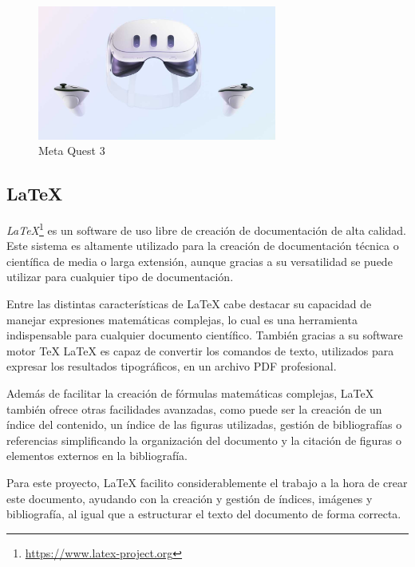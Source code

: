 \documentclass[a4paper, 12pt]{book}
\begin{document}
\begin{figure}[H] 
  \centering
  \includegraphics[width=0.7\textwidth]{img/meta_quest.jpg}
  \caption{Meta Quest 3}
  \label{fig:metaquest}
\end{figure}

\subsection{LaTeX}
\label{subsec:latex}

\textit{LaTeX}\footnote{\url{https://www.latex-project.org}} \cite{mittelbach2004latex} es un software de uso libre de creación de documentación de alta calidad. Este sistema es altamente utilizado para la creación de documentación técnica o científica de media o larga extensión, aunque gracias a su versatilidad se puede utilizar para cualquier tipo de documentación.

Entre las distintas características de LaTeX cabe destacar su capacidad de manejar expresiones matemáticas complejas, lo cual es una herramienta indispensable para cualquier documento científico. También gracias a su software motor TeX LaTeX es capaz de convertir los comandos de texto, utilizados para expresar los resultados tipográficos, en un archivo PDF profesional. 

Además de facilitar la creación de fórmulas matemáticas complejas, LaTeX también ofrece otras facilidades avanzadas, como puede ser la creación de un índice del contenido, un índice de las figuras utilizadas, gestión de bibliografías o referencias simplificando la organización del documento y la citación de figuras o elementos externos en la bibliografía.

Para este proyecto, LaTeX facilito considerablemente el trabajo a la hora de crear este documento, ayudando con la creación y gestión de índices, imágenes y bibliografía, al igual que a estructurar el texto del documento de forma correcta.

\end{document}
